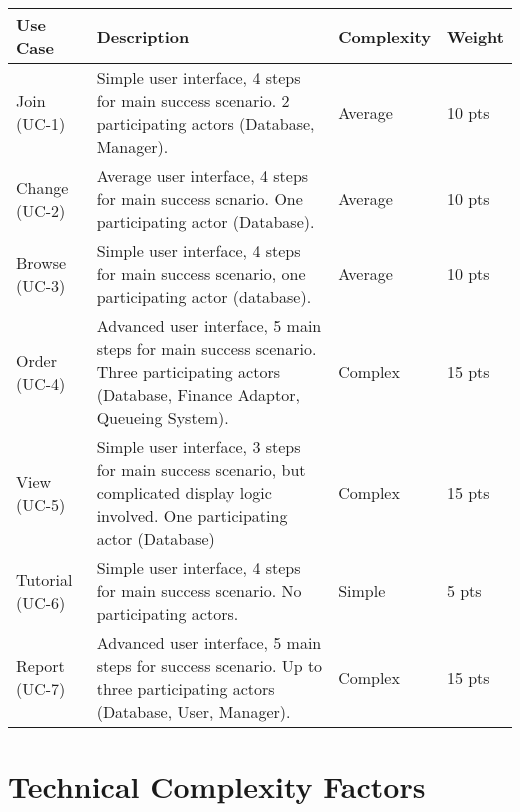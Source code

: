 \renewcommand\arraystretch{2}
\begin{longtable}{|p{1in}|p{3.9in}|p{0.8in}|p{.5in}|}
\hline
{\large \color{color1}Use Case}&{\large \color{color1}Description}&{\large \color{color1}Complexity}&{\large \color{color1}Weight} \\ \hline
Join (UC-1)&Simple user interface, 4 steps for main success scenario. 2 participating actors (Database, Manager).&Average &10 pts \\ \hline 
Change (UC-2)&Average user interface, 4 steps for main success scnario. One participating actor (Database).&Average &10 pts \\ \hline 
Browse (UC-3)&Simple user interface, 4 steps for main success scenario, one participating actor (database).&Average &10 pts \\ \hline 
Order (UC-4)&Advanced user interface, 5 main steps for main success scenario. Three participating actors (Database, Finance Adaptor, Queueing System).&Complex &15 pts \\ \hline 
View (UC-5)&Simple user interface, 3 steps for main success scenario, but complicated display logic involved. One participating actor (Database)&Complex &15 pts \\ \hline 
Tutorial (UC-6)&Simple user interface, 4 steps for main success scenario. No participating actors. &Simple &5 pts \\ \hline 
Report (UC-7)& Advanced user interface, 5 main steps for success scenario. Up to three participating actors (Database, User, Manager). &Complex&15 pts\\ \hline
\end{longtable}

\section{Technical Complexity Factors}

